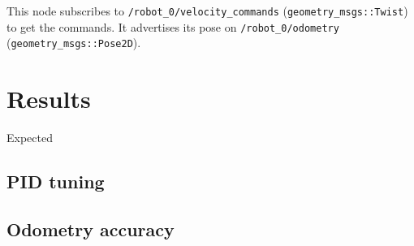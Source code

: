 \documentclass[11pt]{article}
\begin{document}
This node subscribes to \texttt{/robot\_0/velocity\_commands} (\texttt{geometry\_msgs::Twist}) to get the commands. It advertises its pose on \texttt{/robot\_0/odometry} (\texttt{geometry\_msgs::Pose2D}).

\section{Results}

\begin{tabular}[]
  
\end{tabular}
Expected
\subsection{PID tuning}
\label{subsec:pidt}

\subsection{Odometry accuracy}


\end{document}
